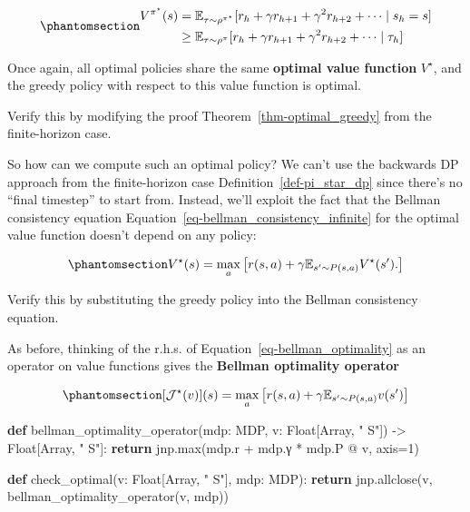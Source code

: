 \documentclass[
  letterpaper,
  DIV=11,
  numbers=noendperiod]{scrreprt}
\newenvironment{Shaded}{\begin{snugshade}}{\end{snugshade}}
\newcommand{\BuiltInTok}[1]{\textcolor[rgb]{0.00,0.23,0.31}{#1}}
\newcommand{\ControlFlowTok}[1]{\textcolor[rgb]{0.00,0.23,0.31}{\textbf{#1}}}
\newcommand{\DecValTok}[1]{\textcolor[rgb]{0.68,0.00,0.00}{#1}}
\newcommand{\KeywordTok}[1]{\textcolor[rgb]{0.00,0.23,0.31}{\textbf{#1}}}
\newcommand{\NormalTok}[1]{\textcolor[rgb]{0.00,0.23,0.31}{#1}}
\newcommand{\OperatorTok}[1]{\textcolor[rgb]{0.37,0.37,0.37}{#1}}
\newcommand{\StringTok}[1]{\textcolor[rgb]{0.13,0.47,0.30}{#1}}
\theoremstyle{plain}
\theoremstyle{plain}
\theoremstyle{definition}
\theoremstyle{definition}
\theoremstyle{remark}
\begin{document}
\begin{equation}\phantomsection\label{eq-optimal_policy_infinite}{
\begin{aligned}
    V^{\pi^\star}(s) &= \mathbb{E}_{\tau \sim \rho^{\pi^{\star}}}[r_h+ \gamma r_{h+1} + \gamma^2 r_{h+2}  + \cdots \mid s_h= s] \\
    &\ge \mathbb{E}_{\tau \sim \rho^{\pi}}[r_h+ \gamma r_{h+1} + \gamma^2 r_{h+2} + \cdots \mid \tau_h]
\end{aligned}
}\end{equation}

Once again, all optimal policies share the same \textbf{optimal value
function} \(V^\star\), and the greedy policy with respect to this value
function is optimal.

Verify this by modifying the proof Theorem~\ref{thm-optimal_greedy} from
the finite-horizon case.

So how can we compute such an optimal policy? We can't use the backwards
DP approach from the finite-horizon case Definition~\ref{def-pi_star_dp}
since there's no ``final timestep'' to start from. Instead, we'll
exploit the fact that the Bellman consistency equation
Equation~\ref{eq-bellman_consistency_infinite} for the optimal value
function doesn't depend on any policy:

\begin{equation}\phantomsection\label{eq-bellman_optimality}{
V^\star(s) = \max_a \left[ r(s, a) + \gamma \mathbb{E}_{s' \sim P(s, a)} V^\star(s'). \right]
}\end{equation}

Verify this by substituting the greedy policy into the Bellman
consistency equation.

As before, thinking of the r.h.s. of
Equation~\ref{eq-bellman_optimality} as an operator on value functions
gives the \textbf{Bellman optimality operator}

\begin{equation}\phantomsection\label{eq-bellman_optimality_operator}{
[\mathcal{J}^{\star}(v)](s) = \max_a \left[ r(s, a) + \gamma \mathbb{E}_{s' \sim P(s, a)} v(s') \right]
}\end{equation}

\begin{Shaded}
\begin{Highlighting}[]
\KeywordTok{def}\NormalTok{ bellman\_optimality\_operator(mdp: MDP, v: Float[Array, }\StringTok{" S"}\NormalTok{]) }\OperatorTok{{-}\textgreater{}}\NormalTok{ Float[Array, }\StringTok{" S"}\NormalTok{]:}
    \ControlFlowTok{return}\NormalTok{ jnp.}\BuiltInTok{max}\NormalTok{(mdp.r }\OperatorTok{+}\NormalTok{ mdp.γ }\OperatorTok{*}\NormalTok{ mdp.P }\OperatorTok{@}\NormalTok{ v, axis}\OperatorTok{=}\DecValTok{1}\NormalTok{)}


\KeywordTok{def}\NormalTok{ check\_optimal(v: Float[Array, }\StringTok{" S"}\NormalTok{], mdp: MDP):}
    \ControlFlowTok{return}\NormalTok{ jnp.allclose(v, bellman\_optimality\_operator(v, mdp))}
\end{Highlighting}
\end{Shaded}
\end{document}
